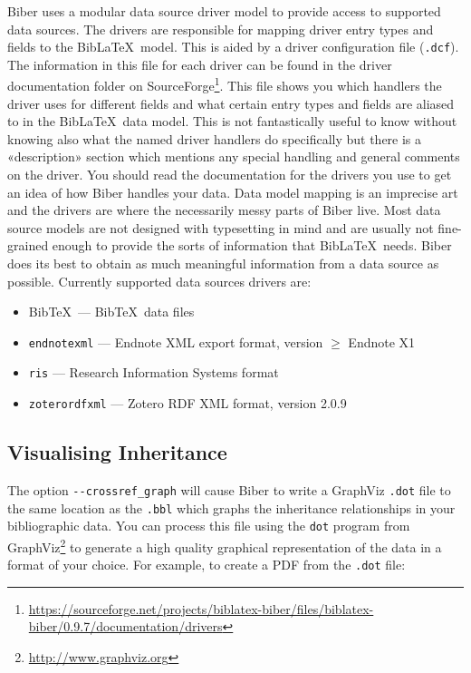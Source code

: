 \documentclass{ltxdockit}
\gdef\biberversion{0.9.7}    %
\begin{document}
Biber uses a modular data source driver model to provide access
to supported data sources. The drivers are responsible for mapping
driver entry types and fields to the Bib\LaTeX\ model. This is
aided by a driver configuration file (\verb+.dcf+). The information in
this file for each driver can be found in the driver documentation folder on
SourceForge\footnote{\url{https://sourceforge.net/projects/biblatex-biber/files/biblatex-biber/\biberversion/documentation/drivers}}. This
file shows you which handlers the driver uses for different fields and
what certain entry types and fields are aliased to in the
Bib\LaTeX\ data model. This is not fantastically useful to know
without knowing also what the named driver handlers do specifically but there
is a «description» section which mentions any special handling and
general comments on the driver. You should read the documentation for
the drivers you use to get an idea of how Biber handles your
data. Data model mapping is an imprecise art
and the drivers are where the necessarily messy parts of Biber
live. Most data source models are not designed with typesetting in
mind and are usually not fine-grained enough to provide the sorts of
information that Bib\LaTeX\ needs. Biber does its best to
obtain as much meaningful information from a data source as possible.
Currently supported data sources drivers are:

\begin{itemize}
\item Bib\TeX\ --- Bib\TeX\ data files
\item \verb+endnotexml+ --- Endnote XML export format, version $\geq$ Endnote X1
\item \verb+ris+ --- Research Information Systems format
\item \verb+zoterordfxml+ --- Zotero RDF XML format, version 2.0.9
\end{itemize}

\subsection{Visualising Inheritance}

The option \verb+--crossref_graph+ will cause Biber to write a
GraphViz \verb+.dot+ file to the same location as the \verb+.bbl+
which graphs the inheritance relationships in your
bibliographic data. You can process this file using the \verb+dot+
program from GraphViz\footnote{\url{http://www.graphviz.org}} to generate a
high quality graphical representation of the data in a format of your
choice. For example, to create a PDF from the \verb+.dot+ file:
\end{document}
